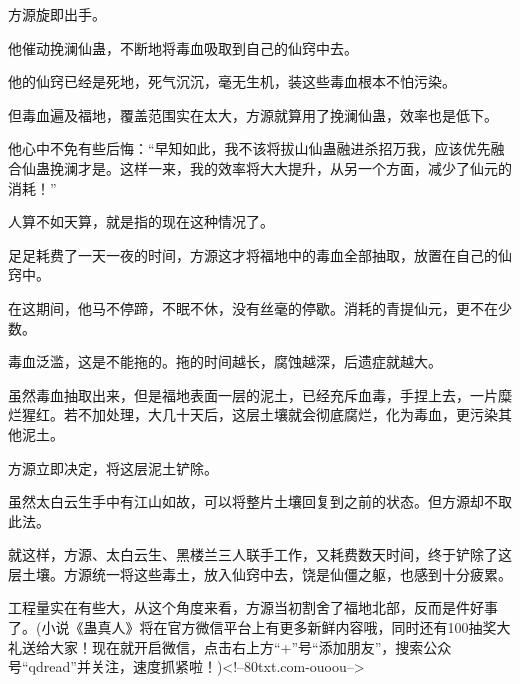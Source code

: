 \begin{this_body}
方源旋即出手。

他催动挽澜仙蛊，不断地将毒血吸取到自己的仙窍中去。

他的仙窍已经是死地，死气沉沉，毫无生机，装这些毒血根本不怕污染。

但毒血遍及福地，覆盖范围实在太大，方源就算用了挽澜仙蛊，效率也是低下。

他心中不免有些后悔：“早知如此，我不该将拔山仙蛊融进杀招万我，应该优先融合仙蛊挽澜才是。这样一来，我的效率将大大提升，从另一个方面，减少了仙元的消耗！”

人算不如天算，就是指的现在这种情况了。

足足耗费了一天一夜的时间，方源这才将福地中的毒血全部抽取，放置在自己的仙窍中。

在这期间，他马不停蹄，不眠不休，没有丝毫的停歇。消耗的青提仙元，更不在少数。

毒血泛滥，这是不能拖的。拖的时间越长，腐蚀越深，后遗症就越大。

虽然毒血抽取出来，但是福地表面一层的泥土，已经充斥血毒，手捏上去，一片糜烂猩红。若不加处理，大几十天后，这层土壤就会彻底腐烂，化为毒血，更污染其他泥土。

方源立即决定，将这层泥土铲除。

虽然太白云生手中有江山如故，可以将整片土壤回复到之前的状态。但方源却不取此法。

就这样，方源、太白云生、黑楼兰三人联手工作，又耗费数天时间，终于铲除了这层土壤。方源统一将这些毒土，放入仙窍中去，饶是仙僵之躯，也感到十分疲累。

工程量实在有些大，从这个角度来看，方源当初割舍了福地北部，反而是件好事了。(小说《蛊真人》将在官方微信平台上有更多新鲜内容哦，同时还有100抽奖大礼送给大家！现在就开启微信，点击右上方“+”号“添加朋友”，搜索公众号“qdread”并关注，速度抓紧啦！)<!--80txt.com-ouoou-->

\end{this_body}

